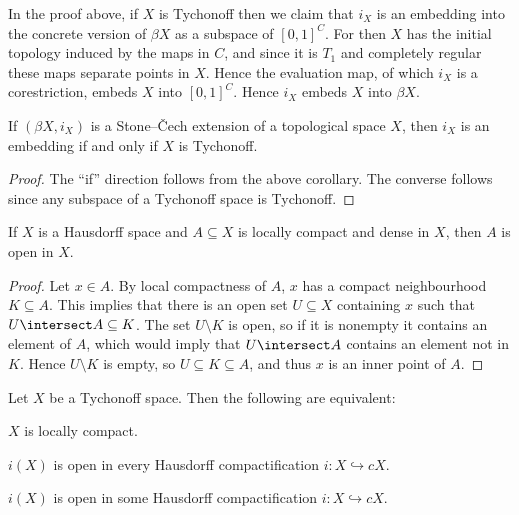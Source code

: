\documentclass[article, a4paper, 11pt, oneside]{memoir}
\numberwithin{equation}{chapter}
\begin{document}
\begin{remark}
    In the proof above, if $X$ is Tychonoff then we claim that $i_X$ is an embedding into the concrete version of $\beta X$ as a subspace of $[0,1]^C$. For then $X$ has the initial topology induced by the maps in $C$, and since it is $T_1$ and completely regular these maps separate points in $X$. Hence the evaluation map, of which $i_X$ is a corestriction, embeds $X$ into $[0,1]^C$. Hence $i_X$ embeds $X$ into $\beta X$.
\end{remark}


\begin{corollary}
    If $(\beta X, i_X)$ is a Stone--\v{C}ech extension of a topological space $X$, then $i_X$ is an embedding if and only if $X$ is Tychonoff.
\end{corollary}

\begin{proof}
    The \enquote{if} direction follows from the above corollary. The converse follows since any subspace of a Tychonoff space is Tychonoff.
\end{proof}


\begin{lemma}
    If $X$ is a Hausdorff space and $A \subseteq X$ is locally compact and dense in $X$, then $A$ is open in $X$.
\end{lemma}

\begin{proof}
    Let $x \in A$. By local compactness of $A$, $x$ has a compact neighbourhood $K \subseteq A$. This implies that there is an open set $U \subseteq X$ containing $x$ such that $U \intersect A \subseteq K$. The set $U \setminus K$ is open, so if it is nonempty it contains an element of $A$, which would imply that $U \intersect A$ contains an element not in $K$. Hence $U \setminus K$ is empty, so $U \subseteq K \subseteq A$, and thus $x$ is an inner point of $A$.
\end{proof}


\begin{corollary}
    Let $X$ be a Tychonoff space. Then the following are equivalent:
    \begin{enumcor}
        \item $X$ is locally compact.
        \item $i(X)$ is open in every Hausdorff compactification $i \colon X \hookrightarrow cX$.
        \item $i(X)$ is open in some Hausdorff compactification $i \colon X \hookrightarrow cX$.
    \end{enumcor}
\end{corollary} %
\end{document}
